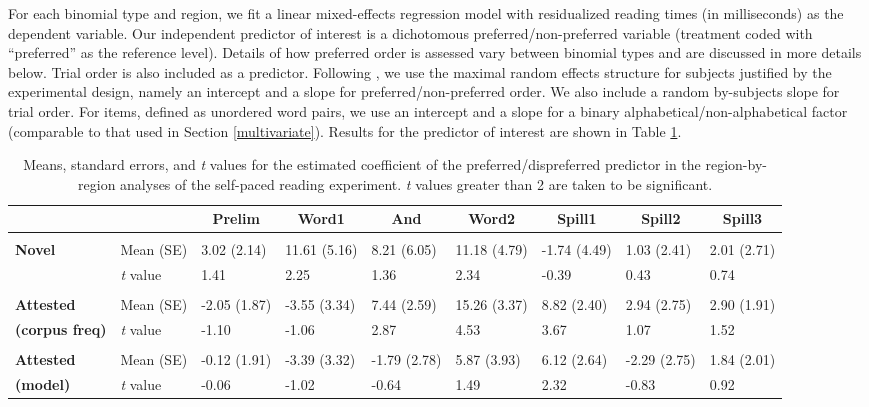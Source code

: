 \documentclass[authoryear]{elsarticle}
\begin{document}
For each binomial type and region, we fit a linear mixed-effects regression model with residualized reading times (in milliseconds) as the dependent variable. Our independent predictor of interest is a dichotomous preferred/non-preferred variable (treatment coded with ``preferred'' as the reference level). Details of how preferred order is assessed vary between binomial types and are discussed in more details below. Trial order is also included as a predictor. Following \citet{Barr:2013vf}, we use the maximal random effects structure for subjects justified by the experimental design, namely an intercept and a slope for preferred/non-preferred order. We also include a random by-subjects slope for trial order. For items, defined as unordered word pairs, we use an intercept and a slope for a binary alphabetical/non-alphabetical factor (comparable to that used in Section \ref{multivariate}). Results for the predictor of interest are shown in Table \ref{tab:spr-results}.

%
\begin{table}[!tbp]
\scriptsize
\caption{Means, standard errors, and \emph{t} values for the estimated coefficient of the preferred/dispreferred predictor in the region-by-region analyses of the self-paced reading experiment. \emph{t} values greater than 2 are taken to be significant.\label{tab:spr-results}} 
\begin{center}
\begin{tabular}{lllllllll}
\hline\hline
\multicolumn{1}{l}{}&\multicolumn{1}{l}{}&\multicolumn{1}{c}{Prelim}&\multicolumn{1}{c}{Word1}&\multicolumn{1}{c}{And}&\multicolumn{1}{c}{Word2}&\multicolumn{1}{c}{Spill1}&\multicolumn{1}{c}{Spill2}&\multicolumn{1}{c}{Spill3}\tabularnewline
\hline
&&&&&&&\tabularnewline
\textbf{Novel}&Mean (SE)&3.02 (2.14)&11.61 (5.16)&8.21 (6.05)&11.18 (4.79)&-1.74 (4.49)&1.03 (2.41)&2.01 (2.71)\tabularnewline
&\emph{t} value&1.41&2.25&1.36&2.34&-0.39&0.43&0.74\tabularnewline
\hline
&&&&&&&\tabularnewline
\textbf{Attested}&Mean (SE)&-2.05 (1.87)&-3.55 (3.34)&7.44 (2.59)&15.26 (3.37)&8.82 (2.40)&2.94 (2.75)&2.90 (1.91)\tabularnewline
\textbf{(corpus freq)}&\emph{t} value&-1.10&-1.06&2.87&4.53&3.67&1.07&1.52\tabularnewline
\hline
&&&&&&&\tabularnewline
\textbf{Attested}&Mean (SE)&-0.12 (1.91)&-3.39 (3.32)&-1.79 (2.78)&5.87 (3.93)&6.12 (2.64)&-2.29 (2.75)&1.84 (2.01)\tabularnewline
\textbf{(model)}&\emph{t} value&-0.06&-1.02&-0.64&1.49&2.32&-0.83&0.92\tabularnewline
\hline
\end{tabular}
\end{center}
\end{table}
\end{document}
